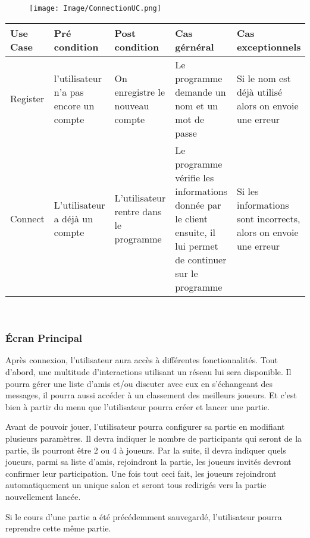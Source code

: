 \documentclass[french, utf8]{article}
\begin{document}
\begin{figure}[ht]
     \centering
    \texttt{[image: Image/ConnectionUC.png]}

\end{figure}
\begin{center}
\begin{tabular}{|m{3cm}|m{3cm}|m{3cm}|m{3cm}|m{3cm}|}
\hline  Use Case & Pré condition      &  Post condition  & Cas gérnéral & Cas exceptionnels\\
\hline Register& l'utilisateur n'a pas  encore un compte & On enregistre le nouveau compte & Le programme demande un nom et un mot de passe & Si le nom est déjà utilisé alors on envoie une erreur  \\
\hline Connect  & L'utilisateur a déjà un compte & L'utilisateur rentre dans le programme & Le programme vérifie les informations donnée par le client ensuite, il lui permet de continuer sur le programme & Si les informations sont incorrects, alors on envoie une erreur \\
\hline
\end{tabular}\\
\end{center}
\subsubsection{Écran Principal}
Après connexion, l'utilisateur aura accès à différentes fonctionnalités. Tout d'abord, une multitude d'interactions utilisant un réseau lui sera disponible. Il pourra gérer une liste d'amis et/ou discuter avec eux en s'échangeant des messages, il pourra aussi accéder à un  classement des meilleurs joueurs. Et c'est bien à partir du menu que l'utilisateur pourra créer et lancer une partie. \newline


Avant de pouvoir jouer, l'utilisateur pourra configurer sa partie en modifiant plusieurs paramètres. Il devra indiquer le nombre de participants qui seront de la partie, ils pourront être 2 ou 4 à joueurs. Par la suite, il devra indiquer quels joueurs, parmi sa liste d'amis, rejoindront la partie, les joueurs invités devront confirmer leur participation. Une fois tout ceci fait, les joueurs rejoindront automatiquement un unique salon et seront tous redirigés vers la partie nouvellement lancée. \newline

Si le cours d'une partie a été précédemment sauvegardé, l'utilisateur pourra reprendre cette même partie.
\end{document}

